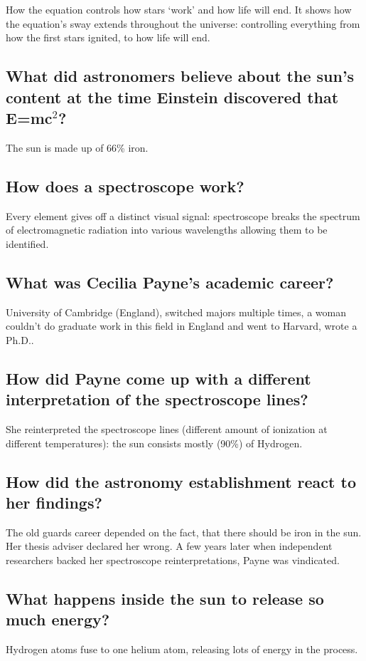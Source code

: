 How the equation controls how stars ‘work’ and how life will end.
It shows how the equation's sway extends throughout the universe: controlling everything from how the first stars ignited, to how life will end.

\subsection*{What did astronomers believe about the sun's content at the time Einstein discovered that E=mc$^2$?}

The sun is made up of 66\% iron.

\subsection*{How does a spectroscope work?}

Every element gives off a distinct visual signal: spectroscope breaks the spectrum of electromagnetic radiation into various wavelengths allowing them to be identified.

\subsection*{What was Cecilia Payne’s academic career?}

University of Cambridge (England), switched majors multiple times, a woman couldn't do graduate work in this field in England and went to Harvard, wrote a Ph.D..

\subsection*{How did Payne come up with a different interpretation of the spectroscope lines?}

She reinterpreted the spectroscope lines (different amount of ionization at different temperatures): the sun consists mostly (90\%) of Hydrogen.

\subsection*{How did the astronomy establishment react to her findings?}

The old guards career depended on the fact, that there should be iron in the sun. Her thesis adviser declared her wrong. A few years later when independent researchers backed her spectroscope reinterpretations, Payne was vindicated.

\subsection*{What happens inside the sun to release so much energy?}

Hydrogen atoms fuse to one helium atom, releasing lots of energy in the process.